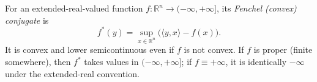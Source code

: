 
For an extended-real-valued function $f:\mathbb R^n\to(-\infty,+\infty]$, its \emph{Fenchel (convex) conjugate} is
\[
f^*(y)=\sup_{x\in\mathbb R^n}\bigl(\langle y,x\rangle-f(x)\bigr).
\]
It is convex and lower semicontinuous even if $f$ is not convex. If $f$ is proper (finite somewhere), then $f^*$ takes values in $(-\infty,+\infty]$; if $f\equiv+\infty$, it is identically $-\infty$ under the extended-real convention.
